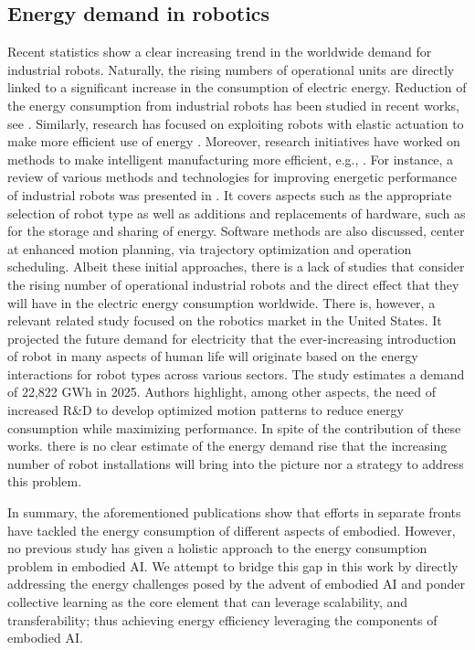 \subsection{Energy demand in robotics}\label{sec:energy_in_robotics}
Recent statistics \cite{IFR2019} show a clear increasing trend in the worldwide demand for industrial robots. Naturally, the rising numbers of operational units are directly linked to a significant increase in the consumption of electric energy. Reduction of the energy consumption from industrial robots has been studied in recent works, see \cite{schroder2014, chalmers2015, mohammed2014, chemnitz2011}. Similarly, research has focused on exploiting robots with elastic actuation to make more efficient use of energy \cite{scalera2019natural, carabin2017review, bolivar2017general, haddadin2011optimal,haddadin2012intrinsically}. Moreover, research initiatives have worked on methods to make intelligent manufacturing more efficient, e.g., \cite{aerus2014, bukata2016energy}. For instance, a review of various methods and technologies for improving energetic performance of industrial robots was presented in \cite{carabin2017review}. It covers aspects such as the appropriate selection of robot type as well as additions and replacements of hardware, such as for the storage and sharing of energy. Software methods are also discussed, center at enhanced motion planning, via trajectory optimization and operation scheduling. Albeit these initial approaches, there is a lack of studies that consider the rising number of operational industrial robots and the direct effect that they will have in the electric energy consumption worldwide. There is, however, a relevant related study focused on the robotics market \cite{barnett_2017} in the United States. It projected the future demand for electricity that the ever-increasing introduction of robot in many aspects of human life will originate based on the energy interactions for robot types across various sectors. The study estimates a demand of 22,822 GWh in 2025. Authors highlight, among other aspects, the need of increased R\&D to develop optimized motion patterns to reduce energy consumption while maximizing performance. In spite of the contribution of these works. there is no clear estimate of the energy demand rise that the increasing number of robot installations will bring into the picture nor a strategy to address this problem.

In summary, the aforementioned publications show that efforts in separate fronts have tackled the energy consumption of different aspects of embodied. However, no previous study has given a holistic approach to the energy consumption problem in embodied AI. We attempt to bridge this gap in this work by directly addressing the energy challenges posed by the advent of embodied AI and ponder collective learning as the core element that can leverage scalability, and transferability; thus achieving energy efficiency leveraging the components of embodied AI.